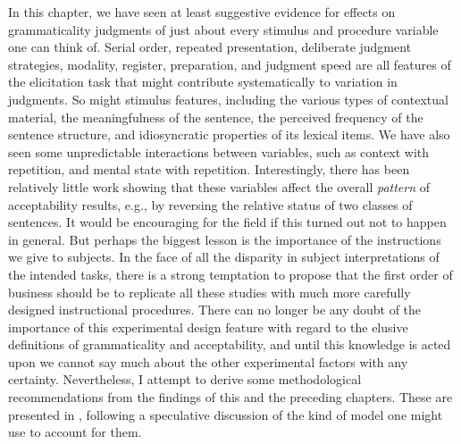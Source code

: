In this chapter, we have seen at least suggestive evidence for effects on grammaticality judgments of just about every stimulus and procedure variable one can think of. Serial order, repeated presentation, deliberate judgment strategies, modality, register, preparation, and judgment speed are all features of the elicitation task that might contribute systematically to variation in judgments. So might stimulus features, including the various types of contextual material, the meaningfulness of the sentence, the perceived frequency of the sentence structure, and idiosyncratic properties of its lexical items. We have also seen some  unpredictable interactions between variables, such as context with repetition, and mental state with repetition. Interestingly, there has been relatively little work showing that these variables affect the overall \textit{pattern} of acceptability results, e.g., by reversing the relative status of two classes of sentences. It would be encouraging for the field if this turned out not to happen in general. But perhaps  the biggest lesson is the importance of the instructions we give to subjects. In the face of all the disparity in subject interpretations of the intended tasks, there is a strong temptation to propose that the first order of business should be to replicate all these studies with much more carefully designed instructional procedures. There can no longer be any doubt of the importance of this experimental design feature with regard to the elusive definitions of grammaticality and acceptability, and until this knowledge is acted upon we cannot say much about the other experimental factors with any certainty. Nevertheless, I attempt to derive some methodological recommendations from the findings of this and the preceding chapters. These are presented in , following a speculative discussion of the kind of model one might use to account for them.